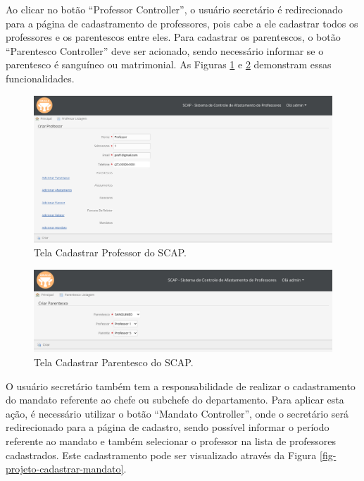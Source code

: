 Ao clicar no botão ``Professor Controller'', o usuário secretário é redirecionado para a página de cadastramento de professores, pois cabe a ele cadastrar todos os professores e os parentescos entre eles. Para cadastrar os parentescos, o botão ``Parentesco Controller'' deve ser acionado, sendo necessário informar se o parentesco é sanguíneo ou matrimonial. As Figuras \ref{fig-projeto-cadastrar-professor} e \ref{fig-projeto-cadastrar-parentesco} demonstram essas funcionalidades.

\begin{figure}[h]
	\centering
	\includegraphics[scale=0.33]{figuras/fig-projeto-cadastrar-professor} 
	\caption{Tela Cadastrar Professor do SCAP.}
	\label{fig-projeto-cadastrar-professor}
\end{figure}

\begin{figure}[h]
	\centering
	\includegraphics[scale=0.33]{figuras/fig-projeto-cadastrar-parentesco} 
	\caption{Tela Cadastrar Parentesco do SCAP.}
	\label{fig-projeto-cadastrar-parentesco}
\end{figure}

O usuário secretário também tem a responsabilidade de realizar o cadastramento do mandato referente ao chefe ou subchefe do departamento. Para aplicar esta ação, é necessário utilizar o botão ``Mandato Controller'', onde o secretário será redirecionado para a página de cadastro, sendo possível informar o período referente ao mandato e também selecionar o professor na lista de professores cadastrados. Este cadastramento pode ser visualizado através da Figura \ref{fig-projeto-cadastrar-mandato}. 

